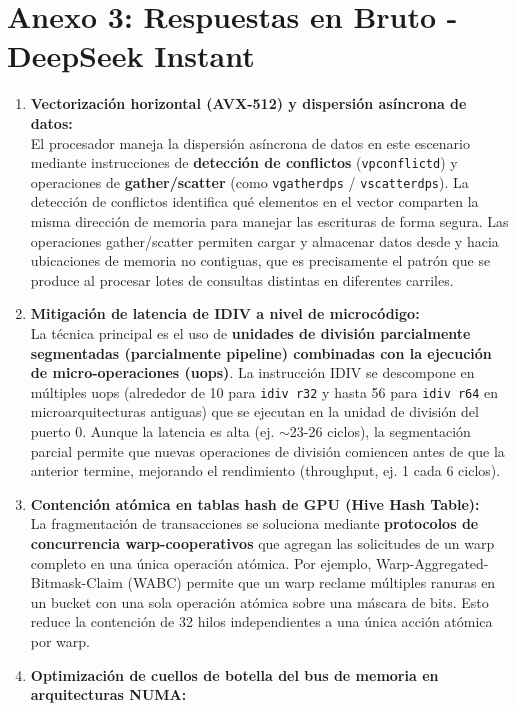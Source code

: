 \documentclass[12pt,a4paper]{report}
\begin{document}
\section{Anexo 3: Respuestas en Bruto - DeepSeek Instant}
\begin{enumerate}
    \item \textbf{Vectorización horizontal (AVX-512) y dispersión asíncrona de datos:}\\
    El procesador maneja la dispersión asíncrona de datos en este escenario mediante instrucciones de \textbf{detección de conflictos} (\texttt{vpconflictd}) y operaciones de \textbf{gather/scatter} (como \texttt{vgatherdps} / \texttt{vscatterdps}). La detección de conflictos identifica qué elementos en el vector comparten la misma dirección de memoria para manejar las escrituras de forma segura. Las operaciones gather/scatter permiten cargar y almacenar datos desde y hacia ubicaciones de memoria no contiguas, que es precisamente el patrón que se produce al procesar lotes de consultas distintas en diferentes carriles.
    \item \textbf{Mitigación de latencia de IDIV a nivel de microcódigo:}\\
    La técnica principal es el uso de \textbf{unidades de división parcialmente segmentadas (parcialmente pipeline) combinadas con la ejecución de micro-operaciones (uops)}. La instrucción IDIV se descompone en múltiples uops (alrededor de 10 para \texttt{idiv r32} y hasta 56 para \texttt{idiv r64} en microarquitecturas antiguas) que se ejecutan en la unidad de división del puerto 0. Aunque la latencia es alta (ej. $\sim$23-26 ciclos), la segmentación parcial permite que nuevas operaciones de división comiencen antes de que la anterior termine, mejorando el rendimiento (throughput, ej. 1 cada 6 ciclos).
    \item \textbf{Contención atómica en tablas hash de GPU (Hive Hash Table):}\\
    La fragmentación de transacciones se soluciona mediante \textbf{protocolos de concurrencia warp-cooperativos} que agregan las solicitudes de un warp completo en una única operación atómica. Por ejemplo, Warp-Aggregated-Bitmask-Claim (WABC) permite que un warp reclame múltiples ranuras en un bucket con una sola operación atómica sobre una máscara de bits. Esto reduce la contención de 32 hilos independientes a una única acción atómica por warp.
    \item \textbf{Optimización de cuellos de botella del bus de memoria en arquitecturas NUMA:}\\

\end{enumerate}
\end{document}
